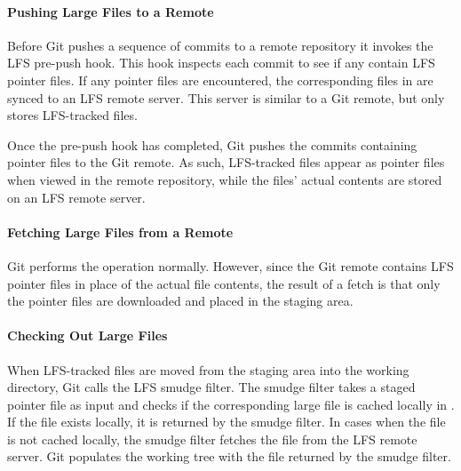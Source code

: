 \paragraph{Pushing Large Files to a Remote}
Before Git pushes a sequence of commits to a remote repository it invokes the LFS pre-push hook. This hook inspects each commit to see if any contain LFS pointer files. If any pointer files are encountered, the corresponding files in  are synced to an LFS remote server. This server is similar to a Git remote, but only stores LFS-tracked files. 

Once the pre-push hook has completed, Git pushes the commits containing pointer files to the Git remote. As such, LFS-tracked files appear as pointer files when viewed in the remote repository, while the files' actual contents are stored on an LFS remote server.


\paragraph{Fetching Large Files from a Remote}
Git performs the  operation normally. However, since the Git remote contains LFS pointer files in place of the actual file contents, the result of a fetch is that only the pointer files are downloaded and placed in the staging area.

\paragraph{Checking Out Large Files}
When LFS-tracked files are moved from the staging area into the working directory, Git calls the LFS smudge filter. The smudge filter takes a staged pointer file as input and checks if the corresponding large file is cached locally in . If the file exists locally, it is returned by the smudge filter. In cases when the file is not cached locally, the smudge filter fetches the file from the LFS remote server. Git populates the working tree with the file returned by the smudge filter.


